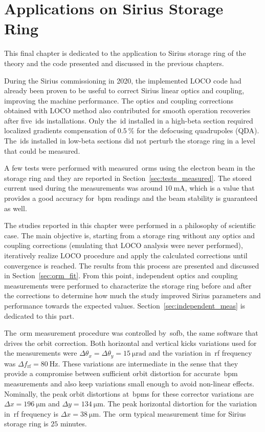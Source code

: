 \chapter{Applications on Sirius Storage Ring}

This final chapter is dedicated to the application to Sirius storage ring of the theory and the code presented and discussed in the previous chapters. 

During the Sirius commissioning in 2020, the implemented LOCO code had already been proven to be useful to correct Sirius linear optics and coupling, improving the machine performance. The optics and coupling corrections obtained with LOCO method also contributed for smooth operation recoveries after five~\glspl{id} installations. Only the~\gls{id} installed in a high-beta section required localized gradients compensation of $\SI{0.5}{\%}$ for the defocusing quadrupoles (QDA). The~\glspl{id} installed in low-beta sections did not perturb the storage ring in a level that could be measured. 

A few tests were performed with measured~\glspl{orm} using the electron beam in the storage ring and they are reported in Section~\ref{sec:tests_measured}. The stored current used during the measurements was around $\SI{10}{\milli\ampere}$, which is a value that provides a good accuracy for~\gls{bpm} readings and the beam stability is guaranteed as well.

The studies reported in this chapter were performed in a philosophy of scientific case. The main objective is, starting from a storage ring without any optics and coupling corrections (emulating that LOCO analysis were never performed), iteratively realize LOCO procedure and apply the calculated corrections until convergence is reached. The results from this process are presented and discussed in Section~\ref{sec:orm_fit}. From this point, independent optics and coupling measurements were performed to characterize the storage ring before and after the corrections to determine how much the study improved Sirius parameters and performance towards the expected values. Section~\ref{sec:independent_meas} is dedicated to this part.

The~\gls{orm} measurement procedure was controlled by~\gls{sofb}, the same software that drives the orbit correction. Both horizontal and vertical kicks variations used for the measurements were $\Delta \theta_x=\Delta \theta_y=\SI{15}{\micro\radian}$ and the variation in~\gls{rf} frequency was $\Delta f_{\mathrm{rf}} = \SI{80}{\hertz}$. These variations are intermediate in the sense that they provide a compromise between sufficient orbit distortion for accurate~\gls{bpm} measurements and also keep variations small enough to avoid non-linear effects. Nominally, the peak orbit distortions at~\glspl{bpm} for these corrector variations are $\Delta x = \SI{196}{\micro\meter}$ and $\Delta y = \SI{134}{\micro\meter}$. The peak horizontal distortion for the variation in~\gls{rf} frequency is $\Delta x = \SI{38}{\micro\meter}$. The~\gls{orm} typical measurement time for Sirius storage ring is $25$ minutes.

